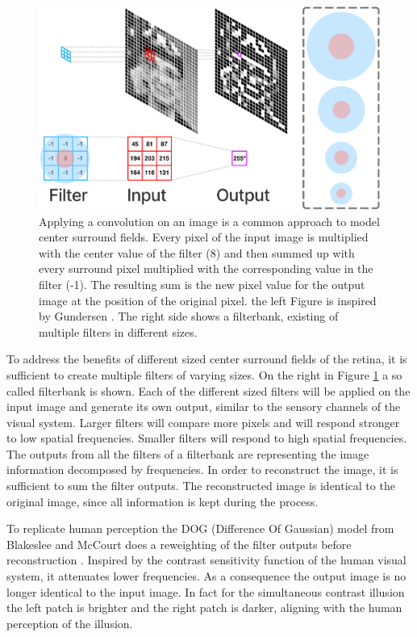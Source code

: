 \begin{figure}[H]
    \centering
    \includegraphics[width=0.7\linewidth]{media/convolution.png}
    \begin{minipage}{0.8\textwidth}
    \caption[Applying a convolution on an image]{ Applying a convolution on an image is a
    common approach to model center surround fields. 
    Every pixel of the input image is multiplied with the center value of the filter (8)
    and then summed up with every surround pixel multiplied with the corresponding value
    in the filter (-1). The resulting sum is the new pixel value for the output image at
    the position of the original pixel. the left Figure is inspired by Gundersen
    \parencite*{Gundersen2017}. The right side shows a filterbank, existing of multiple
    filters in different sizes.}
    \label{fig:figure5}
    \end{minipage}
\end{figure}

To address the benefits of different sized center surround fields of the retina, it is
sufficient to create multiple filters of varying sizes. On the right in Figure
\ref{fig:figure5} a so called filterbank is shown. Each of the different sized filters
will be applied on the input image and generate its own output, similar to the sensory
channels of the visual system. Larger filters will compare more pixels and will respond
stronger to low spatial frequencies. Smaller filters will respond to high spatial
frequencies. The outputs from all the filters of a filterbank are representing the image
information decomposed by frequencies. In order to reconstruct the image, it is sufficient
to sum the filter outputs. The reconstructed image is identical to the original
image, since all information is kept during the process.

To replicate human perception the DOG (Difference Of Gaussian) model from Blakeslee and
McCourt does a reweighting of the filter outputs before reconstruction
\parencite{Blakeslee1997}. Inspired by the contrast sensitivity function of the human
visual system, it attenuates lower frequencies. As a consequence the output image is no
longer identical to the input image. In fact for the simultaneous contrast illusion the
left patch is brighter and the right patch is darker, aligning with the human perception
of the illusion.

